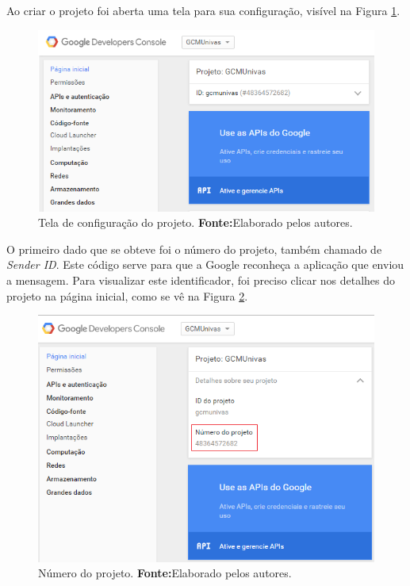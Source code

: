 	\par Ao criar o projeto foi aberta uma tela para sua configuração, visível na
Figura \ref{fig:gcm2}.

	\begin{figure}[h!] 
		\centerline{\includegraphics[scale=0.8]{./imagens/2_q_metodologico/4_procedimentos_resultados/41_gcm/gcm2.png}}
		\caption[Tela de configuração do projeto]{Tela de configuração do projeto.
		\textbf{Fonte:}Elaborado pelos autores.}
		\label{fig:gcm2}
	\end{figure}
	
	\par O primeiro dado que se obteve foi o número do projeto, também chamado de
\textit{Sender ID}. Este código serve para que a Google reconheça a aplicação
que enviou a mensagem. Para visualizar este identificador, foi preciso clicar
nos detalhes do projeto na página inicial, como se vê na Figura \ref{fig:gcm3}.
	
	\begin{figure}[h!] 
		\centerline{\includegraphics[scale=0.8]{./imagens/2_q_metodologico/4_procedimentos_resultados/41_gcm/gcm3.png}}
		\caption[Número do projeto]{Número do projeto.
		\textbf{Fonte:}Elaborado pelos autores.}
		\label{fig:gcm3}
	\end{figure}
	
